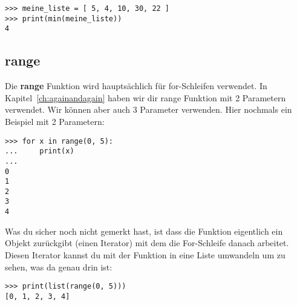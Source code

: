 \begin{Verbatim}[frame=single]
>>> meine_liste = [ 5, 4, 10, 30, 22 ]
>>> print(min(meine_liste))
4
\end{Verbatim}

\subsection*{range}

Die \textbf{range} Funktion wird hauptsächlich für for-Schleifen verwendet. In Kapitel~\ref{ch:againandagain} haben wir dir range Funktion mit 2 Parametern verwendet. Wir können aber auch 3 Parameter verwenden. Hier nochmals ein Beispiel mit 2 Parametern:

\begin{Verbatim}[frame=single]
>>> for x in range(0, 5):
...     print(x)
...
0
1
2
3
4
\end{Verbatim}

\noindent
Was du sicher noch nicht gemerkt hast, ist dass die  Funktion eigentlich ein Objekt zurückgibt (einen Iterator) mit dem die For-Schleife danach arbeitet. Diesen Iterator kannst du mit der  Funktion in eine Liste umwandeln um zu sehen, was da genau drin ist:

\begin{Verbatim}[frame=single]
>>> print(list(range(0, 5)))
[0, 1, 2, 3, 4]
\end{Verbatim}

